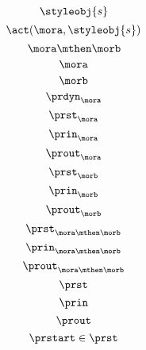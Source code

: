 {  \begin{equation}\label{eq:signal}
  \styleobj{s}
  \end{equation}
  \begin{equation}\label{eq:signal-apply}
    \act(\mora, \styleobj{s})
    \end{equation}
    \begin{equation}\label{eq:morab}
      \mora \mthen \morb
      \end{equation}
      \begin{equation}\label{eq:mora}
        \mora
        \end{equation}
        \begin{equation}\label{eq:morb}
          \morb
          \end{equation}
          \begin{equation}\label{eq:mora-prdyn}
            \prdyn_{\mora}
            \end{equation}
\begin{equation}\label{eq:mora-prst}
\prst_{\mora}
\end{equation}
\begin{equation}\label{eq:mora-prin}
\prin_{\mora}
\end{equation}
\begin{equation}\label{eq:mora-prout}
\prout_{\mora}
\end{equation}
\begin{equation}\label{eq:morb-prst}
  \prst_{\morb}
  \end{equation}
  \begin{equation}\label{eq:morb-prin}
  \prin_{\morb}
  \end{equation}
  \begin{equation}\label{eq:morb-prout}
  \prout_{\morb}
  \end{equation}
  \begin{equation}\label{eq:morab-prst}
    \prst_{\mora\mthen\morb}
    \end{equation}
    \begin{equation}\label{eq:morab-prin}
    \prin_{\mora\mthen\morb}
    \end{equation}
    \begin{equation}\label{eq:morab-prout}
    \prout_{\mora\mthen\morb}
    \end{equation}
  \begin{equation}\label{eq:gen-prst}
    \prst
    \end{equation}
    \begin{equation}\label{eq:gen-prin}
    \prin
    \end{equation}
    \begin{equation}\label{eq:gen-prout}
    \prout
    \end{equation}
      \begin{equation}\label{eq:moore-start}
    \prstart \in \prst
  \end{equation}

}
